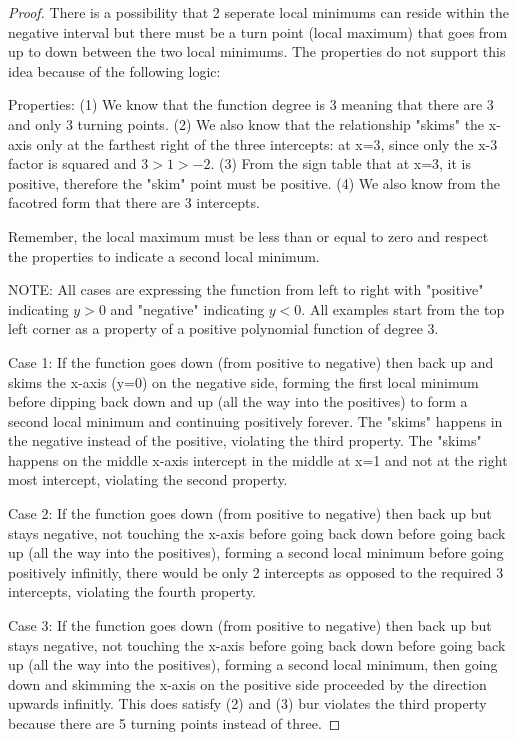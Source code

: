 \documentclass[12pt]{book}
\begin{document}
\begin{enumerate}
\begin{proof}
\vspace{0.5cm}
There is a possibility that 2 seperate local minimums can reside within the negative interval but 
there must be a turn point (local maximum) that goes from up to down between the two local minimums. The properties do not 
support this idea because of the following logic:

\vspace{0.5cm}
Properties: (1) We know that the function degree is 3 meaning that there are 3 and only 3 turning points. 
(2) We also know that the relationship "skims" the x-axis only at the farthest right of the three intercepts:
at x=3, since only the x-3 factor is squared and $3>1>-2$. (3) From the sign table that at x=3, it is positive, 
therefore the "skim" point must be positive. (4) We also know from the facotred form that there are 3 intercepts.

\vspace{0.5cm}
Remember, the local maximum must be less than or equal to zero and respect the properties
to indicate a second local minimum.

\newpage

NOTE: All cases are expressing the function from left to right with "positive" indicating $y > 0$ and "negative" indicating $y < 0$. 
All examples start from the top left corner as a property of a positive polynomial function of degree 3.
\vspace{0.5cm}

Case 1: If the function goes down (from positive to negative) then back up and skims the x-axis (y=0) on 
the negative side, forming the first local minimum before dipping back down and up (all the way into the positives) 
to form a second local minimum and continuing positively forever. The "skims" happens in the negative instead of the positive, violating the third property.
The "skims" happens on the middle x-axis intercept in the middle at x=1 and not at the right most intercept, violating the second property.
\vspace{0.5cm}

Case 2: If the function goes down (from positive to negative) then back up but stays negative, not touching the x-axis before going 
back down before going back up (all the way into the positives), forming a second local minimum before going positively infinitly, there would be only 2 intercepts 
as opposed to the required 3 intercepts, violating the fourth property.
\vspace{0.5cm}

Case 3: If the function goes down (from positive to negative) then back up but stays negative, not touching the x-axis before going 
back down before going back up (all the way into the positives), forming a second local minimum, then going down and skimming the 
x-axis on the positive side proceeded by the direction upwards infinitly. This does satisfy (2) and (3) bur violates the third property 
because there are 5 turning points instead of three.
\vspace{0.5cm}


\end{proof}
\end{enumerate}
\end{document}
